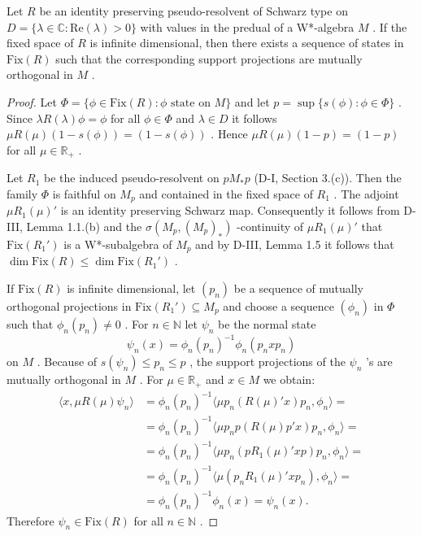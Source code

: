 \begin{lemma}\label{lem:d4-4.1}
Let $ R $  be an identity preserving pseudo-resolvent of Schwarz type on $ D = \{\lambda \in \mathbb{C}: \text{Re}(\lambda) > 0\} $  with values in the predual of a W*-algebra $ M $ .
If the fixed space of $ R $  is infinite dimensional, then there exists a sequence of states in $ \text{Fix}(R) $  such that the corresponding support projections are mutually orthogonal in $ M $ .
\end{lemma}

\begin{proof}
Let $ \Phi = \{\phi \in \text{Fix}(R): \phi \text{ state on } M\} $  and let $ p = \sup\{s(\phi): \phi \in \Phi\} $ .
Since $ \lambda R(\lambda)\phi = \phi $  for all $ \phi \in \Phi $  and $ \lambda \in D $  it follows $ \mu R(\mu)(1-s(\phi)) = (1-s(\phi)) $ .
Hence $ \mu R(\mu)(1-p) = (1-p) $  for all $ \mu \in \mathbb{R}_{+} $ .

Let $ R_{1} $  be the induced pseudo-resolvent on $ pM_{*}p $  (D-I, Section 3.(c)).
Then the family $ \Phi $  is faithful on $ M_{p} $  and contained in the fixed space of $ R_{1} $ .
The adjoint $ \mu R_{1}(\mu)' $  is an identity preserving Schwarz map.
Consequently it follows from D-III, Lemma 1.1.(b) and the $ \sigma(M_{p},(M_{p})_{*}) $ -continuity of $ \mu R_{1}(\mu)' $  that $ \text{Fix}(R_{1}') $  is a W*-subalgebra of $ M_{p} $  and by D-III, Lemma 1.5 it follows that $ \dim \text{Fix}(R) \leq \dim \text{Fix}(R_{1}') $ .

If $ \text{Fix}(R) $  is infinite dimensional, let $ (p_{n}) $  be a sequence of mutually orthogonal projections in $ \text{Fix}(R_{1}') \subseteq M_{p} $  and choose a sequence $ (\phi_{n}) $  in $ \Phi $  such that $ \phi_{n}(p_{n}) \neq 0 $ .
For $ n \in \mathbb{N} $  let $ \psi_{n} $  be the normal state
\[
\psi_{n}(x) = \phi_{n}(p_{n})^{-1}\phi_{n}(p_{n}xp_{n})
\]
on $ M $ .
Because of $ s(\psi_{n}) \leq p_{n} \leq p $ , the support projections of the $ \psi_{n} $ 's are mutually orthogonal in $ M $ .
For $ \mu \in \mathbb{R}_{+} $  and $ x \in M $  we obtain:
\[
\begin{aligned}
\langle x,\mu R(\mu)\psi_{n}\rangle &= \phi_{n}(p_{n})^{-1}\langle\mu p_{n}(R(\mu)'x)p_{n},\phi_{n}\rangle = \\
&= \phi_{n}(p_{n})^{-1}\langle\mu p_{n}p(R(\mu)p'x)p_{n},\phi_{n}\rangle = \\
&= \phi_{n}(p_{n})^{-1}\langle\mu p_{n}(pR_{1}(\mu)'xp)p_{n},\phi_{n}\rangle = \\
&= \phi_{n}(p_{n})^{-1}\langle\mu(p_{n}R_{1}(\mu)'xp_{n}),\phi_{n}\rangle = \\
&= \phi_{n}(p_{n})^{-1}\phi_{n}(x) = \psi_{n}(x).
\end{aligned}
\]
Therefore $ \psi_{n} \in \text{Fix}(R) $  for all $ n \in \mathbb{N} $ .
\end{proof}


